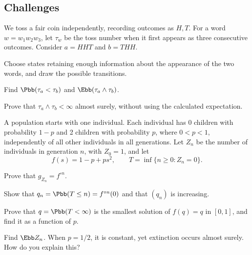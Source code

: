 \subsection*{Challenges}
\begin{problemstar}\label{prob:week4-penney}
We toss a fair coin independently, recording outcomes as $H,T$. For a word
$w=w_1w_2w_3$, let $\tau_w$ be the toss number when it first appears as three
consecutive outcomes. Consider $a=HHT$ and $b=THH$.
\begin{enumeratea}
  \item Choose states retaining enough information about the appearance of the
  two words, and draw the possible transitions.
  \item Find $\Pbb(\tau_a<\tau_b)$ and $\Ebb(\tau_a\wedge\tau_b)$.
  \item Prove that $\tau_a\wedge\tau_b<\infty$ almost surely, without using the calculated expectation.
\end{enumeratea}
\end{problemstar}
\begin{problemstar}
A population starts with one individual. Each individual has 0 children with
probability $1-p$ and 2 children with probability $p$, where $0<p<1$, independently
of all other individuals in all generations. Let $Z_n$ be the number of individuals
in generation $n$, with $Z_0=1$, and let
\[ f(s)=1-p+ps^2,\qquad T=\inf\{n\ge0:Z_n=0\}. \]
\begin{enumeratea}
  \item Prove that $g_{Z_n}=f^{\circ n}$.
  \item Show that $q_n=\Pbb(T\le n)=f^{\circ n}(0)$ and that $(q_n)$ is increasing.
  \item Prove that $q=\Pbb(T<\infty)$ is the smallest solution of $f(q)=q$ in
  $[0,1]$, and find it as a function of $p$.
  \item Find $\Ebb Z_n$. When $p=1/2$, it is constant, yet extinction occurs almost surely.
  How do you explain this?
\end{enumeratea}
\end{problemstar}
